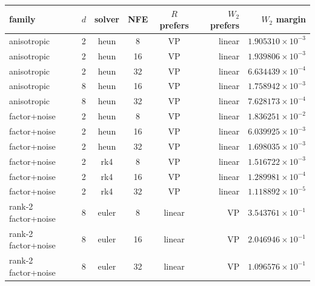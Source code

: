 \begin{tabular}{llcccrr}
\toprule
family & $d$ & solver & NFE & $R$ prefers & $W_2$ prefers & $W_2$ margin \\
\midrule
anisotropic & 2 & heun & 8 & VP & linear & $1.905310\times 10^{-3}$ \\
anisotropic & 2 & heun & 16 & VP & linear & $1.939806\times 10^{-3}$ \\
anisotropic & 2 & heun & 32 & VP & linear & $6.634439\times 10^{-4}$ \\
anisotropic & 8 & heun & 16 & VP & linear & $1.758942\times 10^{-3}$ \\
anisotropic & 8 & heun & 32 & VP & linear & $7.628173\times 10^{-4}$ \\
factor+noise & 2 & heun & 8 & VP & linear & $1.836251\times 10^{-2}$ \\
factor+noise & 2 & heun & 16 & VP & linear & $6.039925\times 10^{-3}$ \\
factor+noise & 2 & heun & 32 & VP & linear & $1.698035\times 10^{-3}$ \\
factor+noise & 2 & rk4 & 8 & VP & linear & $1.516722\times 10^{-3}$ \\
factor+noise & 2 & rk4 & 16 & VP & linear & $1.289981\times 10^{-4}$ \\
factor+noise & 2 & rk4 & 32 & VP & linear & $1.118892\times 10^{-5}$ \\
rank-2 factor+noise & 8 & euler & 8 & linear & VP & $3.543761\times 10^{-1}$ \\
rank-2 factor+noise & 8 & euler & 16 & linear & VP & $2.046946\times 10^{-1}$ \\
rank-2 factor+noise & 8 & euler & 32 & linear & VP & $1.096576\times 10^{-1}$ \\
\bottomrule
\end{tabular}
